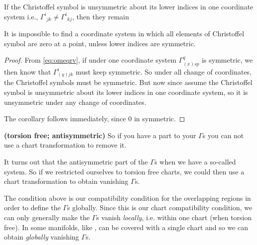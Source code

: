 \documentclass[12pt]{article} %
\newcommand{\bfs}[1]{\textbf{({#1}) }}
\begin{document}
\begin{lema}\label{lem:iqneadff}
If the Christoffel symbol is unsymmetric about its lower indices in one coordinate system i.e., ${\Gamma ^{i}}_{jk}\neq {\Gamma ^{i}}_{kj}$, then they remain 
\end{lema}
\begin{cora}\label{cor:iqdncdac}
It is impossible to find a coordinate system in which all elements of Christoffel symbol are zero at a point, unless lower indices are symmetric. 
\end{cora}
\begin{proof}
From \cref{eq:omeqrv}, if under one  coordinate system $\Gamma^{q}_{(x)sp}$ is symmetric, we then know that $ \Gamma^i_{(y)jk} $ must keep symmetric. So under all change of coordinates, the Christoffel symbols must be symmetric. But now since assume the Christoffel symbol is unsymmetric about its lower indices in one coordinate system, so it is unsymmetric under any change of coordinates.

The corollary follows immediately, since $0$ in symmetric.
\end{proof}



\br \bfs{torsion free; antisymmetric}
    So if you have a  part to your $\Gamma$s you can not use a chart transformation to remove it.
    
    It turns out that the antisymmetric part of the $\Gamma$s  when we have a so-called   system. So if we restricted ourselves to torsion free charts, we could then use a chart transformation to obtain  vanishing $\Gamma$s.
\er 


The condition above is our compatibility condition for the overlapping regions in order to define the $\Gamma$s globally. Since this is our chart compatibility condition, we can only generally make the $\Gamma$s vanish \textit{locally}, i.e. within one chart (when {torsion free}). In some manifolds, like , can be covered with a single chart and so we can obtain \textit{globally} vanishing $\Gamma$s.
\end{document}
